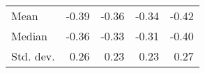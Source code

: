 \begin{tabular}{lllll}
\multicolumn{1}{l}{\hspace{2em}Mean} &
  \multicolumn{1}{|r}{-0.39} &
  \multicolumn{1}{r}{-0.36} &
  \multicolumn{1}{r}{-0.34} &
  \multicolumn{1}{r}{-0.42} \\
\multicolumn{1}{l}{\hspace{2em}Median} &
  \multicolumn{1}{|r}{-0.36} &
  \multicolumn{1}{r}{-0.33} &
  \multicolumn{1}{r}{-0.31} &
  \multicolumn{1}{r}{-0.40} \\
\multicolumn{1}{l}{\hspace{2em}Std. dev.} &
  \multicolumn{1}{|r}{0.26} &
  \multicolumn{1}{r}{0.23} &
  \multicolumn{1}{r}{0.23} &
  \multicolumn{1}{r}{0.27} \\
\cline{1-5}
\end{tabular}
